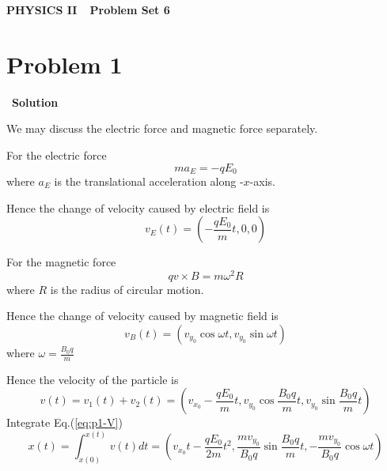 \documentclass[12pt,a4paper]{article}
\begin{document}
\centerline{\Huge{{\textbf{PHYSICS II\ \ Problem Set 6}}}}
\vspace{0.5cm}

\section*{\large \textbf{Problem 1}}~{\textbf{Solution}}
    \par We may discuss the electric force and magnetic force separately.
    \par For the electric force
    \begin{equation}
        ma_E = -qE_0
        \label{eq:p1-electric}
    \end{equation}
    where $a_E$ is the translational acceleration along -$x$-axis.
    \par Hence the change of velocity caused by electric field is
    \begin{equation}
        v_E(t) = \left( -\frac{qE_0}{m}t, 0, 0 \right)
        \label{eq:p1-Ve}
    \end{equation}
    \par For the magnetic force
    \begin{equation}
        qv\times B = m\omega^2 R
        \label{eq:p1-magnetic}
    \end{equation}
    where $R$ is the radius of circular motion.
    \par Hence the change of velocity caused by magnetic field is
    \begin{equation}
        v_B(t) = \left( v_{y_0}\cos\omega t, v_{y_0}\sin\omega t \right)
        \label{eq:p1-Vb}
    \end{equation}
    where $\omega = \frac{B_0q}{m}$
    \par Hence the velocity of the particle is
    \begin{equation}
        v(t) = v_1(t) + v_2(t) = \left( v_{x_0}-\frac{qE_0}{m}t, v_{y_0}\cos\frac{B_0q}{m}t, v_{y_0}\sin\frac{B_0q}{m}t \right)
        \label{eq:p1-V}
    \end{equation}
    Integrate Eq.(\ref{eq:p1-V})
    \begin{equation}
        x(t) = \int_{x(0)}^{x(t)} v(t)dt = \left( v_{x_0}t-\frac{qE_0}{2m}t^2, \frac{mv_{y_0}}{B_0q}\sin\frac{B_0q}{m}t, -\frac{mv_{y_0}}{B_0q}\cos\omega t \right)
        \label{eq:p1-x}
    \end{equation}
    
\end{document}
